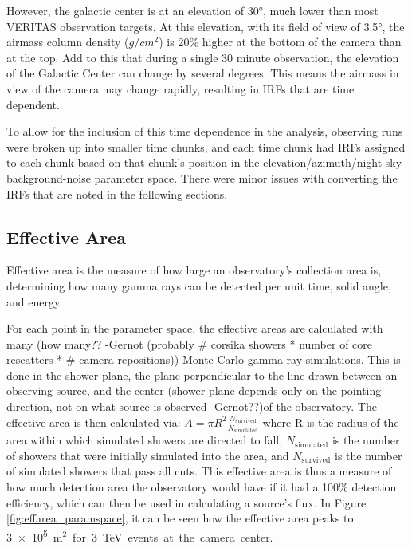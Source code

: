   However, the galactic center is at an elevation of \ang{30}, much lower than most VERITAS observation targets.
  At this elevation, with its field of view of \ang{3.5}, the airmass column density ($g/cm^{2}$) is 20\% higher at the bottom of the camera than at the top.
  Add to this that during a single 30 minute observation, the elevation of the Galactic Center can change by several degrees.
  This means the airmass in view of the camera may change rapidly, resulting in IRFs that are time dependent.

  To allow for the inclusion of this time dependence in the analysis, observing runs were broken up into smaller time chunks, and each time chunk had IRFs assigned to each chunk based on that chunk's position in the elevation/azimuth/night-sky-background-noise parameter space.
  There were minor issues with converting the IRFs that are noted in the following sections.

  \FloatBarrier
  
  \subsection{Effective Area}\label{subsec:effarea}
    Effective area is the measure of how large an observatory's collection area is, determining how many gamma rays can be detected per unit time, solid angle, and energy.

    For each point in the parameter space, the effective areas are calculated with many {\color{red}(how many?? -Gernot (probably # corsika showers * number of core rescatters * # camera repositions))} Monte Carlo gamma ray simulations.
    This is done in the shower plane, {\color{red} the plane perpendicular to the line drawn between an observing source, and the center (shower plane depends only on the pointing direction, not on what source is observed -Gernot??)}of the observatory.
    The effective area is then calculated via:
    $A=\pi R^2 \frac{N_{\text{survived}}}{N_{\text{simulated}}}$
    where R is the radius of the area within which simulated showers are directed to fall, $N_{\text{simulated}}$ is the number of showers that were initially simulated into the area, and $N_{\text{survived}}$ is the number of simulated showers that pass all cuts.
    This effective area is thus a measure of how much detection area the observatory would have if it had a 100\% detection efficiency, which can then be used in calculating a source's flux.
    In Figure \ref{fig:effarea_paramspace}, it can be seen how the effective area peaks to \nicetilde{}\SI{3e5}{m${}^2$} for \SI{3}{\TeV} events at the camera center.

